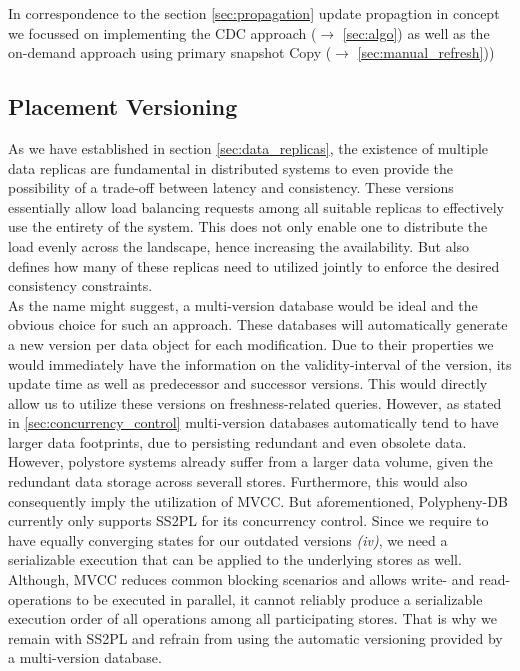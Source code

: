 In correspondence to the section \ref{sec:propagation} update propagtion in concept we focussed on implementing the CDC approach ($\rightarrow$ \ref{sec:algo}) 
as well as the on-demand approach using primary snapshot Copy ($\rightarrow$ \ref{sec:manual_refresh}))


\subsection{Placement Versioning}

As we have established in section \ref{sec:data_replicas}, the existence of multiple data replicas are fundamental in distributed systems to even provide the 
possibility of a trade-off between latency and consistency. These versions essentially allow load balancing requests among all suitable replicas to effectively 
use the entirety of the system. This does not only enable one to distribute the load evenly across the landscape, hence increasing the availability.
But also defines how many of these replicas need to utilized jointly to enforce the desired consistency constraints.\\

As the name might suggest, a multi-version database would be ideal and the obvious choice for such an approach.
These databases will automatically generate a new version per data object for each modification. 
Due to their properties we would immediately have the information on the validity-interval of the version, its update time as well as predecessor and successor versions.
This would directly allow us to utilize these versions on freshness-related queries. 
However, as stated in \ref{sec:concurrency_control} multi-version databases automatically tend to have larger data footprints, due to persisting  
redundant and even obsolete data.
However, polystore systems already suffer from a larger data volume, given the redundant data storage across severall stores.
Furthermore, this would also consequently imply the utilization of MVCC.
But aforementioned, Polypheny-DB currently only supports SS2PL for its concurrency control.
Since we require to have equally converging states for our outdated versions \textit{(iv)}, we need a serializable execution that can be applied to 
the underlying stores as well.
Although, MVCC reduces common blocking scenarios and allows write- and read-operations to be executed in parallel, 
it cannot reliably produce a serializable execution order of all operations among all participating stores.
That is why we remain with SS2PL and refrain from using the automatic versioning provided by a multi-version database.\\

